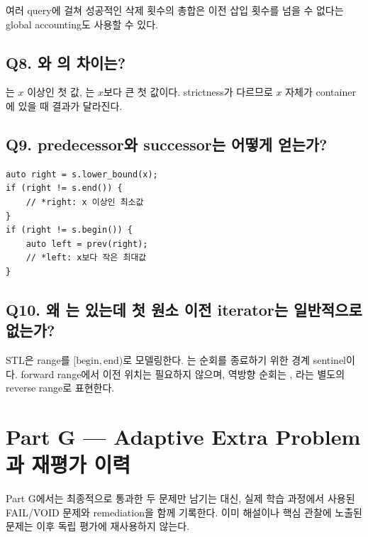 여러 query에 걸쳐 성공적인 삭제 횟수의 총합은 이전 삽입 횟수를 넘을 수 없다는 global accounting도 사용할 수 있다.

\subsection{Q8. 와 의 차이는?}
는 $x$ 이상인 첫 값, 는 $x$보다 큰 첫 값이다. strictness가 다르므로 $x$ 자체가 container에 있을 때 결과가 달라진다.

\subsection{Q9. predecessor와 successor는 어떻게 얻는가?}
\begin{lstlisting}
auto right = s.lower_bound(x);
if (right != s.end()) {
    // *right: x 이상인 최소값
}
if (right != s.begin()) {
    auto left = prev(right);
    // *left: x보다 작은 최대값
}
\end{lstlisting}

\subsection{Q10. 왜 는 있는데 첫 원소 이전 iterator는 일반적으로 없는가?}
STL은 range를 $[\text{begin},\text{end})$로 모델링한다. 는 순회를 종료하기 위한 경계 sentinel이다. forward range에서  이전 위치는 필요하지 않으며, 역방향 순회는 , 라는 별도의 reverse range로 표현한다.

\section{Part G --- Adaptive Extra Problem과 재평가 이력}

Part G에서는 최종적으로 통과한 두 문제만 남기는 대신, 실제 학습 과정에서 사용된 FAIL/VOID 문제와 remediation을 함께 기록한다. 이미 해설이나 핵심 관찰에 노출된 문제는 이후 독립 평가에 재사용하지 않는다.

